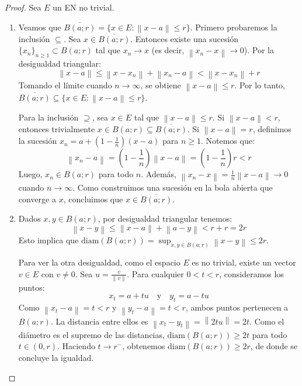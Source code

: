 \documentclass{article}
\theoremstyle{definition}
\newcommand{\norm}[1]{\left\lVert #1 \right\rVert}       %
\newcommand{\cl}[1]{\overline{#1}}                        %
\newcommand{\bola}[2]{B(#1;#2)}                           %
\newcommand{\diam}{\text{diam}}
\begin{document}
\begin{proof}
    Sea \( E \) un EN no trivial.
    \begin{enumerate}
        \item Veamos que \( \cl{\bola{a}{r}} = \{ x \in E : \norm{x-a} \leq r \} \).
              Primero probaremos la inclusión \( \subseteq \). Sea \( x \in \cl{\bola{a}{r}} \). Entonces existe una sucesión \( {\{x_n\}}_{n\geq 1} \subset \bola{a}{r} \) tal que \( x_n \to x \) (es decir, \( \norm{x_n - x} \to 0 \)). Por la desigualdad triangular:
              \[
                  \norm{x - a} \leq \norm{x - x_n} + \norm{x_n - a} < \norm{x - x_n} + r
              \]
              Tomando el límite cuando \( n \to \infty \), se obtiene \( \norm{x - a} \leq r \). Por lo tanto, \( \cl{\bola{a}{r}} \subseteq \{ x \in E : \norm{x-a} \leq r \} \).

              Para la inclusión \( \supseteq \), sea \( x \in E \) tal que \( \norm{x-a} \leq r \). Si \( \norm{x-a} < r \), entonces trivialmente \( x \in \bola{a}{r} \subseteq \cl{\bola{a}{r}} \). Si \( \norm{x-a} = r \), definimos la sucesión \( x_n = a + \left(1 - \frac{1}{n}\right)(x-a) \) para \( n \geq 1 \). Notemos que:
              \[
                  \norm{x_n - a} = \left(1 - \frac{1}{n}\right)\norm{x-a} = \left(1 - \frac{1}{n}\right)r < r
              \]
              Luego, \( x_n \in \bola{a}{r} \) para todo \( n \). Además, \( \norm{x_n - x} = \frac{1}{n}\norm{x-a} \to 0 \) cuando \( n \to \infty \). Como construimos una sucesión en la bola abierta que converge a \( x \), concluimos que \( x \in \cl{\bola{a}{r}} \).

        \item Dados \( x, y \in \bola{a}{r} \), por desigualdad triangular tenemos:
              \[
                  \norm{x - y} \leq \norm{x - a} + \norm{a - y} < r + r = 2r
              \]
              Esto implica que \( \diam(\bola{a}{r}) = \sup_{x,y \in \bola{a}{r}} \norm{x-y} \leq 2r \).

              Para ver la otra desigualdad, como el espacio \( E \) es no trivial, existe un vector \( v \in E \) con \( v \neq 0 \). Sea \( u = \frac{v}{\norm{v}} \). Para cualquier \( 0 < t < r \), consideramos los puntos:
              \[
                  x_t = a + tu \quad \text{y} \quad y_t = a - tu
              \]
              Como \( \norm{x_t - a} = t < r \) y \( \norm{y_t - a} = t < r \), ambos puntos pertenecen a \( \bola{a}{r} \). La distancia entre ellos es \( \norm{x_t - y_t} = \norm{2tu} = 2t \).
              Como el diámetro es el supremo de las distancias, \( \diam(\bola{a}{r}) \geq 2t \) para todo \( t \in (0, r) \). Haciendo \( t \to r^- \), obtenemos \( \diam(\bola{a}{r}) \geq 2r \), de donde se concluye la igualdad.


\end{enumerate}
\end{proof}
\end{document}
